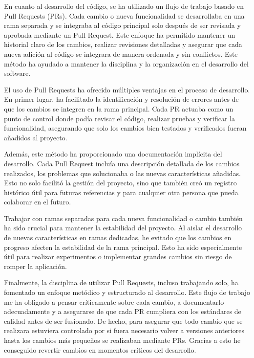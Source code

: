 En cuanto al desarrollo del código, se ha utilizado un flujo de trabajo basado en Pull Requests (PRs). Cada cambio o nueva 
funcionalidad se desarrollaba en una rama separada y se integraba al código principal solo después de ser revisada y aprobada 
mediante un Pull Request. Este enfoque ha permitido mantener un historial claro de los cambios, realizar revisiones detalladas y 
asegurar que cada nueva adición al código se integrara de manera ordenada y sin conflictos. Este método ha ayudado a mantener la disciplina y la organización en el
 desarrollo del software.

El uso de Pull Requests ha ofrecido múltiples ventajas en el proceso de desarrollo. En primer lugar, ha facilitado la identificación y 
resolución de errores antes de que los cambios se integren en la rama principal. Cada PR actuaba como un punto de control donde podía revisar 
el código, realizar pruebas y verificar la funcionalidad, asegurando que solo los cambios bien testados y verificados fueran añadidos al proyecto.

Además, este método ha proporcionado una documentación implícita del desarrollo. Cada Pull Request incluía una descripción detallada de los 
cambios realizados, los problemas que solucionaba o las nuevas características añadidas. Esto no solo facilitó la gestión del proyecto, sino 
que también creó un registro histórico útil para futuras referencias y para cualquier otra persona que pueda colaborar en el futuro.

Trabajar con ramas separadas para cada nueva funcionalidad o cambio también ha sido crucial para mantener la estabilidad del proyecto. Al aislar el 
desarrollo de nuevas características en ramas dedicadas, he evitado que los cambios en progreso afecten la estabilidad de la rama principal. Esto ha 
sido especialmente útil para realizar experimentos o implementar grandes cambios sin riesgo de romper la aplicación.

Finalmente, la disciplina de utilizar Pull Requests, incluso trabajando solo, ha fomentado un enfoque metódico y estructurado al desarrollo. Este 
flujo de trabajo me ha obligado a pensar críticamente sobre cada cambio, a documentarlo adecuadamente y a asegurarse de que cada PR cumpliera con los 
estándares de calidad antes de ser fusionado. De hecho, para asegurar que todo cambio que se realizara estuviera controlado por si fuera necesario volver a versiones anteriores
hasta los cambios más pequeños se realizaban mediante PRs. Gracias a esto he conseguido revertir cambios en momentos críticos del desarrollo.

